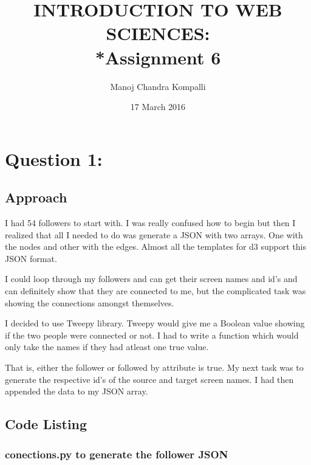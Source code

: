 \documentclass[12pt]{article}
\begin{document}
\begin{titlepage}
\title{INTRODUCTION TO WEB SCIENCES:\\*Assignment 6}
\author{Manoj Chandra Kompalli}
\date{17 March 2016}
\maketitle
\end{titlepage}

\tableofcontents
\newpage

\section{Question 1:  }


\subsection{Approach}
 I had 54 followers to start with. I was really confused how to begin but then I realized that all I needed to do was generate a JSON with two arrays. One with the nodes and other with the edges. Almost all the templates for d3 support this JSON format.\par I could loop through my followers and can get their screen names and id’s and can definitely show that they are connected to me, but the complicated task was showing the connections amongst themselves.\par I decided to use Tweepy library. Tweepy would give me a Boolean value showing if the two people were connected or not. I had to write a function which would only take the names if they had atleast one true value. \par That is, either the follower or followed by attribute is true. My next task was to generate the respective id’s of the source and target screen names. I had then appended the data to my JSON array. 



 \newpage

\subsection{Code Listing}
\subsubsection{conections.py to generate the follower JSON}

\newpage
\end{document}
